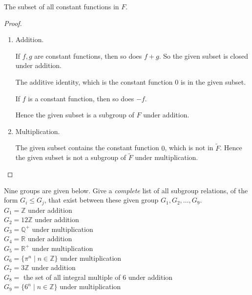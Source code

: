 \newpage
\begin{exercise}
    The subset of all constant functions in $F$.
\end{exercise}

\begin{proof}
    \begin{enumerate}[label={(\alph*)}]
        \item Addition.

              If $f, g$ are constant functions, then so does $f + g$. So the given subset is closed under addition.

              The additive identity, which is the constant function $0$ is in the given subset.

              If $f$ is a constant function, then so does $-f$.

              Hence the given subset is a subgroup of $F$ under addition.
        \item Multiplication.

              The given subset contains the constant function $0$, which is not in $\tilde{F}$. Hence the given subset is not a subgroup of $\tilde{F}$ under multiplication.
    \end{enumerate}
\end{proof}

\newpage
\begin{exercise}
    Nine groups are given below. Give a \textit{complete} list of all subgroup relations, of the form $G_{i} \leq G_{j}$, that exist between these given group $G_{1}, G_{2}, \ldots, G_{9}$. \\
    $G_{1} = \mathbb{Z}$ under addition \\
    $G_{2} = 12\mathbb{Z}$ under addition \\
    $G_{3} = \mathbb{Q}^{+}$ under multiplication \\
    $G_{4} = \mathbb{R}$ under addition \\
    $G_{5} = \mathbb{R}^{+}$ under multiplication \\
    $G_{6} = \{ \pi^{n} \mid n\in\mathbb{Z} \}$ under multiplication \\
    $G_{7} = 3\mathbb{Z}$ under addition \\
    $G_{8} =$ the set of all integral multiple of $6$ under addition \\
    $G_{9} = \{ 6^{n} \mid n\in\mathbb{Z} \}$ under multiplication
\end{exercise}

